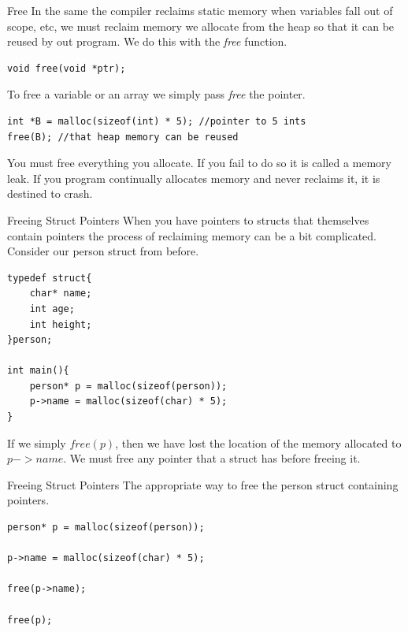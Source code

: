 \documentclass{beamer}
\begin{document}
\begin{frame}[fragile]{Free}
In the same the compiler reclaims static memory when variables fall out of scope, etc, we must reclaim memory we allocate from the heap so that it can be reused by out program. We do this with the {\it free} function.

\begin{verbatim}
void free(void *ptr);
\end{verbatim}

To free a variable or an array we simply pass {\it free} the pointer.
\begin{verbatim}
int *B = malloc(sizeof(int) * 5); //pointer to 5 ints
free(B); //that heap memory can be reused
\end{verbatim}
You must free everything you allocate. If you fail to do so it is called a memory leak. If you program continually allocates memory and never reclaims it, it is destined to crash.
\end{frame}

\begin{frame}[fragile]{Freeing Struct Pointers} 
When you have pointers to structs that themselves contain pointers the process of reclaiming memory can be a bit complicated. Consider our person struct from before.
\begin{verbatim}
typedef struct{
	char* name;
	int age;
	int height;
}person;

int main(){
	person* p = malloc(sizeof(person));
	p->name = malloc(sizeof(char) * 5);
}
\end{verbatim}
If we simply $free(p)$, then we have lost the location of the memory allocated to $p->name$. We must free any pointer that a struct has before freeing it.
\end{frame}

\begin{frame}[fragile]{Freeing Struct Pointers} 
The appropriate way to free the person struct containing pointers.
\begin{verbatim}
person* p = malloc(sizeof(person));

p->name = malloc(sizeof(char) * 5);

free(p->name);

free(p);
\end{verbatim}


\end{frame}
\end{document}
